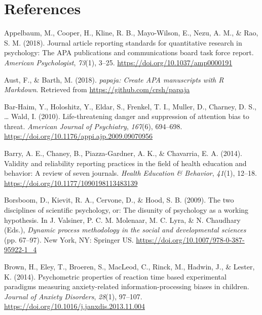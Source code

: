 \documentclass[english,,man,floatsintext]{apa6}
\begin{document}
\newpage

\hypertarget{references}{%
\section{References}\label{references}}

\setlength{\parindent}{-0.5in}
\setlength{\leftskip}{0.5in}
\setlength{\parskip}{8pt}

\noindent

\hypertarget{refs}{}
\leavevmode\hypertarget{ref-appelbaum_journal_2018}{}%
Appelbaum, M., Cooper, H., Kline, R. B., Mayo-Wilson, E., Nezu, A. M., \& Rao, S. M. (2018). Journal article reporting standards for quantitative research in psychology: The APA publications and communications board task force report. \emph{American Psychologist}, \emph{73}(1), 3--25. \url{https://doi.org/10.1037/amp0000191}

\leavevmode\hypertarget{ref-R-papaja}{}%
Aust, F., \& Barth, M. (2018). \emph{papaja: Create APA manuscripts with R Markdown}. Retrieved from \url{https://github.com/crsh/papaja}

\leavevmode\hypertarget{ref-bar-haim_life-threatening_2010}{}%
Bar-Haim, Y., Holoshitz, Y., Eldar, S., Frenkel, T. I., Muller, D., Charney, D. S., \ldots{} Wald, I. (2010). Life-threatening danger and suppression of attention bias to threat. \emph{American Journal of Psychiatry}, \emph{167}(6), 694--698. \url{https://doi.org/10.1176/appi.ajp.2009.09070956}

\leavevmode\hypertarget{ref-barry_validity_2014}{}%
Barry, A. E., Chaney, B., Piazza-Gardner, A. K., \& Chavarria, E. A. (2014). Validity and reliability reporting practices in the field of health education and behavior: A review of seven journals. \emph{Health Education \& Behavior}, \emph{41}(1), 12--18. \url{https://doi.org/10.1177/1090198113483139}

\leavevmode\hypertarget{ref-valsiner_two_2009}{}%
Borsboom, D., Kievit, R. A., Cervone, D., \& Hood, S. B. (2009). The two disciplines of scientific psychology, or: The disunity of psychology as a working hypothesis. In J. Valsiner, P. C. M. Molenaar, M. C. Lyra, \& N. Chaudhary (Eds.), \emph{Dynamic process methodology in the social and developmental sciences} (pp. 67--97). New York, NY: Springer US. \url{https://doi.org/10.1007/978-0-387-95922-1_4}

\leavevmode\hypertarget{ref-brown_psychometric_2014}{}%
Brown, H., Eley, T., Broeren, S., MacLeod, C., Rinck, M., Hadwin, J., \& Lester, K. (2014). Psychometric properties of reaction time based experimental paradigms measuring anxiety-related information-processing biases in children. \emph{Journal of Anxiety Disorders}, \emph{28}(1), 97--107. \url{https://doi.org/10.1016/j.janxdis.2013.11.004}
\end{document}
